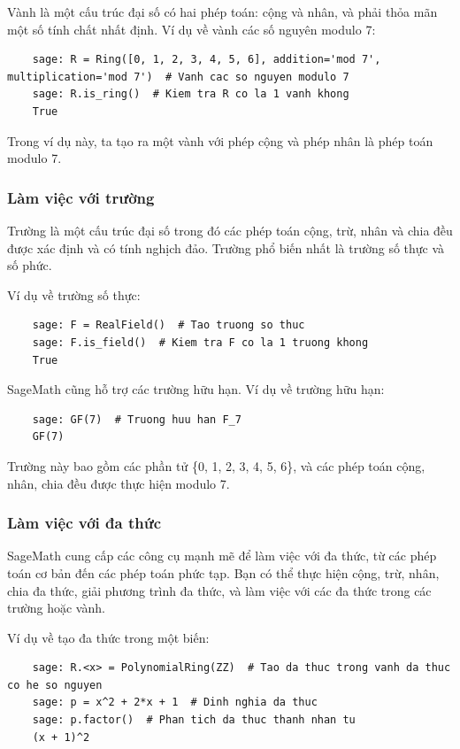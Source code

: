 Vành là một cấu trúc đại số có hai phép toán: cộng và nhân, và phải thỏa mãn một số tính chất nhất định. Ví dụ về vành các số nguyên modulo 7:

\begin{lstlisting}
	sage: R = Ring([0, 1, 2, 3, 4, 5, 6], addition='mod 7', multiplication='mod 7')  # Vanh cac so nguyen modulo 7
	sage: R.is_ring()  # Kiem tra R co la 1 vanh khong
	True
\end{lstlisting}

Trong ví dụ này, ta tạo ra một vành với phép cộng và phép nhân là phép toán modulo 7.

\subsubsection{Làm việc với trường}

Trường là một cấu trúc đại số trong đó các phép toán cộng, trừ, nhân và chia đều được xác định và có tính nghịch đảo. Trường phổ biến nhất là trường số thực và số phức.

Ví dụ về trường số thực:

\begin{lstlisting}
	sage: F = RealField()  # Tao truong so thuc
	sage: F.is_field()  # Kiem tra F co la 1 truong khong
	True
\end{lstlisting}

SageMath cũng hỗ trợ các trường hữu hạn. Ví dụ về trường hữu hạn:

\begin{lstlisting}
	sage: GF(7)  # Truong huu han F_7
	GF(7)
\end{lstlisting}

Trường này bao gồm các phần tử \{0, 1, 2, 3, 4, 5, 6\}, và các phép toán cộng, nhân, chia đều được thực hiện modulo 7.

\subsubsection{Làm việc với đa thức}

SageMath cung cấp các công cụ mạnh mẽ để làm việc với đa thức, từ các phép toán cơ bản đến các phép toán phức tạp. Bạn có thể thực hiện cộng, trừ, nhân, chia đa thức, giải phương trình đa thức, và làm việc với các đa thức trong các trường hoặc vành.

Ví dụ về tạo đa thức trong một biến:

\begin{lstlisting}
	sage: R.<x> = PolynomialRing(ZZ)  # Tao da thuc trong vanh da thuc co he so nguyen
	sage: p = x^2 + 2*x + 1  # Dinh nghia da thuc
	sage: p.factor()  # Phan tich da thuc thanh nhan tu
	(x + 1)^2
\end{lstlisting}

